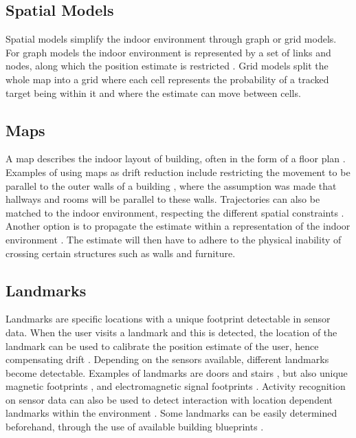 \subsection{Spatial Models}

Spatial models simplify the indoor environment through graph or grid models. For graph models the indoor environment is represented by a set of links and nodes, along which the position estimate is restricted \cite{Davidson2017,Jackermeier2018}. Grid models split the whole map into a grid where each cell represents the probability of a tracked target being within it \cite{Gu2019} and where the estimate can move between cells.\par 

\subsection{Maps}

A map describes the indoor layout of building, often in the form of a floor plan \cite{Gu2019}. Examples of using maps as drift reduction include restricting the movement to be parallel to the outer walls of a building \cite{Abdulrahim2011}, where the assumption was made that hallways and rooms will be parallel to these walls. Trajectories can also be matched to  the indoor environment, respecting the different spatial constraints \cite{Gu2019}. Another option is to propagate the estimate within a representation of the indoor environment \cite{Qian2015}. The estimate will then have to adhere to the physical inability of crossing certain structures such as walls and furniture.\par

\subsection{Landmarks}

Landmarks are specific locations with a unique footprint detectable in sensor data. When the user visits a landmark and this is detected, the location of the landmark can be used to calibrate the position estimate of the user, hence compensating drift \cite{Diaz2017}. Depending on the sensors available, different landmarks become detectable. Examples of landmarks are doors and stairs \cite{Diaz2017,Gu2019,Torok2014}, but also unique magnetic footprints \cite{MunozDiaz2019}, and electromagnetic signal footprints \cite{Gu2019}. Activity recognition on sensor data can also be used to detect interaction with location dependent landmarks within the environment \cite{Hardegger2012, Hardegger2016}.  Some landmarks can be easily determined beforehand, through the use of available building blueprints \cite{Gu2019}. 


